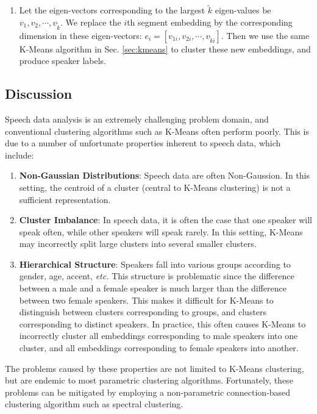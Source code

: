 \documentclass{article}
\begin{document}
\begin{enumerate}
\item Let the eigen-vectors corresponding to the largest $\widetilde{k}$
eigen-values be
$v_1, v_2, \cdots, v_{\widetilde{k}}$.
We replace the $i$th segment embedding by the corresponding dimension in these eigen-vectors:
$e_i=[v_{1i}, v_{2i}, \cdots, v_{\widetilde{k}i}]$.
Then we use the same K-Means algorithm in Sec. \ref{sec:kmeans} to cluster these
new embeddings, and produce speaker labels.
\end{enumerate}

\subsection{Discussion}
Speech data analysis is an extremely challenging problem domain, and conventional clustering algorithms such as K-Means often perform poorly. This is due to a number of unfortunate properties inherent to speech data, which include:

\begin{enumerate}[label=(\roman*)]
  \item \textbf{Non-Gaussian Distributions}: Speech data are often Non-Gaussion. In this setting, the centroid of a cluster (central to K-Means clustering)
        is not a sufficient representation.
  \item \textbf{Cluster Imbalance}: In speech data, it is often the case that one speaker will speak often, while other speakers will speak rarely. In this setting, K-Means may incorrectly split large clusters into several smaller clusters.
  \item \textbf{Hierarchical Structure}: Speakers fall into various groups according to gender, age, accent, \textit{etc.} This structure is problematic since the difference between a male and a female speaker is much larger than the difference between two female speakers. This makes it difficult for K-Means to distinguish between clusters corresponding to groups, and clusters corresponding to distinct speakers. In practice, this often causes K-Means to incorrectly cluster all embeddings corresponding to male speakers into one cluster, and all embeddings corresponding to female speakers into another.
\end{enumerate}

The problems caused by these properties are not limited to K-Means clustering, but are endemic to most parametric clustering algorithms. Fortunately, these problems can be mitigated by employing a non-parametric connection-based clustering algorithm such as spectral clustering.
\end{document}
